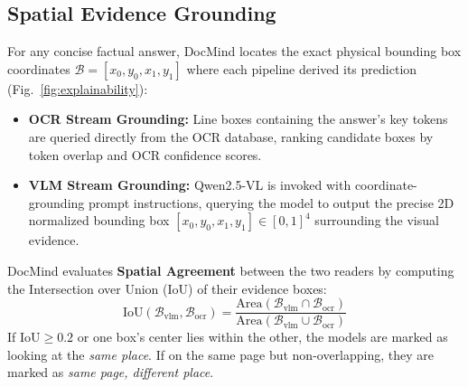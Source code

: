 \documentclass[conference]{IEEEtran}
\begin{document}
\subsection{Spatial Evidence Grounding}
For any concise factual answer, DocMind locates the exact physical bounding box coordinates $\mathcal{B} = [x_0, y_0, x_1, y_1]$ where each pipeline derived its prediction (Fig.~\ref{fig:explainability}):
\begin{itemize}
    \item \textbf{OCR Stream Grounding:} Line boxes containing the answer's key tokens are queried directly from the OCR database, ranking candidate boxes by token overlap and OCR confidence scores.
    \item \textbf{VLM Stream Grounding:} Qwen2.5-VL is invoked with coordinate-grounding prompt instructions, querying the model to output the precise 2D normalized bounding box $[x_0, y_0, x_1, y_1] \in [0, 1]^4$ surrounding the visual evidence.
\end{itemize}

DocMind evaluates \textbf{Spatial Agreement} between the two readers by computing the Intersection over Union (IoU) of their evidence boxes:
\begin{equation}
    \text{IoU}(\mathcal{B}_{\text{vlm}}, \mathcal{B}_{\text{ocr}}) = \frac{\text{Area}(\mathcal{B}_{\text{vlm}} \cap \mathcal{B}_{\text{ocr}})}{\text{Area}(\mathcal{B}_{\text{vlm}} \cup \mathcal{B}_{\text{ocr}})}
    \label{eq:iou}
\end{equation}
If $\text{IoU} \ge 0.2$ or one box's center lies within the other, the models are marked as looking at the \textit{same place}. If on the same page but non-overlapping, they are marked as \textit{same page, different place}.
\end{document}
